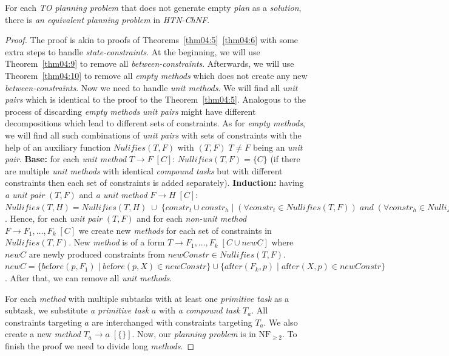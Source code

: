\begin{thm}\label{thm04:12}
    For each \emph{TO planning problem} that does not generate empty \emph{plan} as a \emph{solution}, there is \emph{an equivalent planning problem} in \emph{HTN-ChNF}.
\end{thm}
\begin{proof}
    The proof is akin to proofs of Theorems~\ref{thm04:5}~\ref{thm04:6} with some extra steps to handle \emph{state-constraints}. At the beginning, we will use Theorem~\ref{thm04:9} to remove all \emph{between-constraints}. Afterwards, we will use Theorem~\ref{thm04:10} to remove all \emph{empty methods} which does not create any new \emph{between-constraints}. Now we need to handle \emph{unit methods}. We will find all \emph{unit pairs} which is identical to the proof to the Theorem~\ref{thm04:5}. Analogous to the process of discarding \emph{empty methods} \emph{unit pairs} might have different decompositions which lead to different sets of constraints. As for \emph{empty methods}, we will find all such combinations of \emph{unit pairs} with sets of constraints with the help of an auxiliary function $Nulifies(T, F)$ with $(T, F) \; T \neq F$ being an \emph{unit pair}. \textbf{Base:} for each \emph{unit method} $T \rightarrow F \; [C]$: $Nullifies(T, F) = \{C\}$ (if there are multiple \emph{unit methods} with identical \emph{compound tasks} but with different constraints then each set of constraints is added separately). \textbf{Induction:} having \emph{a unit pair} $(T, F)$ and \emph{a unit method} $F \rightarrow H \; [C]$: $Nullifies(T, H) = Nullifies(T, H) \; \cup \; \{constr_t \cup constr_h \; | \; (\forall constr_t \in Nullifies(T, F)) \; and \; (\forall constr_h \in Nullifies(F, H))\}$. Hence, for each \emph{unit pair} $(T, F)$ and for each \emph{non-unit method} $F \rightarrow F_1, \dots, F_k \; [C]$ we create new \emph{methods} for each set of constraints in $Nullifies(T, F)$. New \emph{method} is of a form $T \rightarrow F_1, \dots, F_k \; [C \cup newC]$ where $newC$ are newly produced constraints from $newConstr \in Nullifies(T, F)$. $newC = \{be\text{f}ore(p, F_1) \; | \; be\text{f}ore(p, X) \in newConstr\} \cup \{a\text{f}ter(F_k, p) \; | \; a\text{f}ter(X, p) \in newConstr\}$. After that, we can remove all \emph{unit methods}.

    For each \emph{method} with multiple subtasks with at least one \emph{primitive task} as a subtask, we substitute \emph{a primitive task} $a$ with \emph{a compound task} $T_a$. All constraints targeting $a$ are interchanged with constraints targeting $T_a$. We also create a new \emph{method} $T_a \rightarrow a \; [\{\}]$. Now, our \emph{planning problem} is in $\text{NF}_{\geq 2}$. To finish the proof we need to divide long \emph{methods}.


\end{proof}

